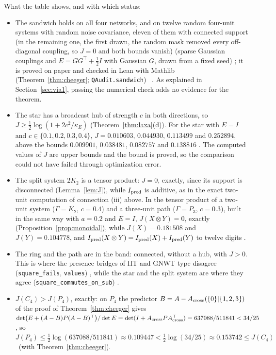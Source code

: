 What the table shows, and with which status:
\begin{itemize}
\item The sandwich holds on all four networks, and on twelve random four-unit systems with random noise covariance, eleven of them with connected support (in the remaining one, the first drawn, the random mask removed every off-diagonal coupling, so $J=0$ and both bounds vanish) (sparse Gaussian couplings and $E=GG^\top+\tfrac12I$ with Gaussian $G$, drawn from a fixed seed) \stN; it is proved on paper and checked in Lean with Mathlib (Theorem~\ref{thm:cheeger}; \texttt{QAudit.sandwich}) \stA\ \stM. As explained in Section~\ref{sec:via1}, passing the numerical check adds no evidence for the theorem.
\item The star has a broadcast hub of strength $c$ in both directions, so $J\ge\tfrac12\log(1+2c^2/\kappa_E)$ (Theorem~\ref{thm:laxa}(d)). For the star with $E=I$ and $c\in\{0.1,0.2,0.3,0.4\}$, $J=0.010603$, $0.044930$, $0.113499$ and $0.252894$, above the bounds $0.009901$, $0.038481$, $0.082757$ and $0.138816$ \stN. The computed values of $J$ are upper bounds and the bound is proved, so the comparison could not have failed through optimization error.
\item The split system $2K_2$ is a tensor product: $J=0$, exactly, since its support is disconnected (Lemma~\ref{lem:J}), while $I_{\rm pred}$ is additive, as in the exact two-unit computation of connection (iii) above. In the tensor product of a two-unit system ($\Gamma=K_2$, $c=0.4$) and a three-unit path ($\Gamma=P_3$, $c=0.3$), built in the same way with $a=0.2$ and $E=I$, $J(X\otimes Y)=0$, exactly (Proposition~\ref{prop:monoidal}), while $J(X)=0.181508$ and $J(Y)=0.104778$, and $I_{\rm pred}(X\otimes Y)=I_{\rm pred}(X)+I_{\rm pred}(Y)$ to twelve digits \stN.
\item The ring and the path are in the band: connected, without a hub, with $J>0$. This is where the presence bridges of IIT and GNWT type disagree (\texttt{square\_fails}, \texttt{values}) \stL, while the star and the split system are where they agree (\texttt{square\_commutes\_on\_sub}) \stL. \item $J(C_4)>J(P_4)$, exactly: on $P_4$ the predictor $B=A-A_{\rm cross}(\{0\}|\{1,2,3\})$ of the proof of Theorem~\ref{thm:cheeger} gives $\det\bigl(E+(A-B)P(A-B)^\top\bigr)/\det E=\det(I+A_{\rm cross}PA_{\rm cross}^\top)=637088/511841<34/25$, so $J(P_4)\le\tfrac12\log(637088/511841)\approx0.109447<\tfrac12\log(34/25)\approx0.153742\le J(C_4)$ \stS\ (with Theorem~\ref{thm:cheeger}).
\end{itemize}
